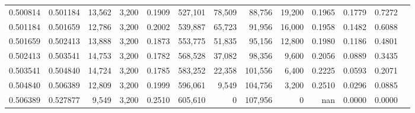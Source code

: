 \begin{tabular}{rrrrrrrrrrrrr}
0.500814 & 0.501184 & 13,562 & 3,200 &                                     0.1909 & 527,101 &  78,509 &  88,756 &  19,200 & 0.1965 & 0.1779 & 0.7272 \\
0.501184 & 0.501659 & 12,786 & 3,200 &                                     0.2002 & 539,887 &  65,723 &  91,956 &  16,000 & 0.1958 & 0.1482 & 0.6088 \\
0.501659 & 0.502413 & 13,888 & 3,200 &                                     0.1873 & 553,775 &  51,835 &  95,156 &  12,800 & 0.1980 & 0.1186 & 0.4801 \\
0.502413 & 0.503541 & 14,753 & 3,200 &                                     0.1782 & 568,528 &  37,082 &  98,356 &   9,600 & 0.2056 & 0.0889 & 0.3435 \\
0.503541 & 0.504840 & 14,724 & 3,200 &                                     0.1785 & 583,252 &  22,358 & 101,556 &   6,400 & 0.2225 & 0.0593 & 0.2071 \\
0.504840 & 0.506389 & 12,809 & 3,200 &                                     0.1999 & 596,061 &   9,549 & 104,756 &   3,200 & 0.2510 & 0.0296 & 0.0885 \\
0.506389 & 0.527877 &  9,549 & 3,200 &                                     0.2510 & 605,610 &       0 & 107,956 &       0 &    nan & 0.0000 & 0.0000 \\
\bottomrule
\end{tabular}
